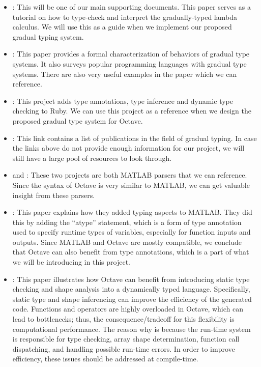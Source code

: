 \begin{itemize}
    \item \citet{siek2012interpretations}: This will be one of our main
        supporting documents. This paper serves as a tutorial on how to
        type-check and interpret the gradually-typed lambda calculus. We will
        use this as a guide when we implement our proposed gradual typing
        system.
    \item \citet{siek2015refined}: This paper provides a formal characterization
        of behaviors of gradual type systems. It also surveys popular
        programming languages with gradual type systems. There are also very
        useful examples in the paper which we can reference.
    \item \citet{furr2009combining}: This project adds type annotations, type
        inference and dynamic type checking to Ruby. We can use this project as
        a reference when we design the proposed gradual type system for Octave.
    \item \citet{samth2013gradual}: This link contains a list of publications in
        the field of gradual typing. In case the links above do not provide
        enough information for our project, we will still have a large pool of
        resources to look through.
    \item \citet{ewiger2013decade} and \citet{ericharley2013matlab}: These
        two projects are both MATLAB parsers that we can reference. Since the
        syntax of Octave is very similar to MATLAB, we can get valuable insight
        from these parsers.
    \item \citet{hendren2011typing}: This paper explains how they added typing
        aspects to MATLAB. They did this by adding the ``atype'' statement,
        which is a form of type annotation used to specify runtime types of
        variables, especially for function inputs and outputs. Since MATLAB and
        Octave are mostly compatible, we conclude that Octave can also benefit
        from type annotations, which is a part of what we will be introducing in
        this project.
    \item \citet{olmos2003turning}: This paper illustrates how Octave can
        benefit from introducing static type checking and shape analysis into a
        dynamically typed language. Specifically, static type and shape
        inferencing can improve the efficiency of the generated code. Functions
        and operators are highly overloaded in Octave, which can lead to
        bottlenecks; thus, the consequence/tradeoff for this flexibility is
        computational performance. The reason why is because the run-time system
        is responsible for type checking, array shape determination, function
        call dispatching, and handling possible run-time errors. In order to
        improve efficiency, these issues should be addressed at compile-time.
\end{itemize}

